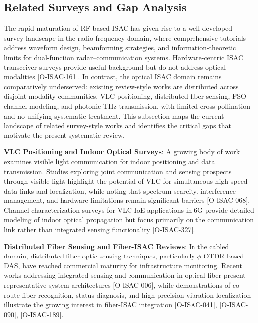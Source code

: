 \subsection{Related Surveys and Gap Analysis}
\label{sec:intro-related}

The rapid maturation of RF-based ISAC has given rise to a well-developed survey landscape in the radio-frequency domain, where comprehensive tutorials address waveform design, beamforming strategies, and information-theoretic limits for dual-function radar--communication systems. Hardware-centric ISAC transceiver surveys provide useful background but do not address optical modalities [O-ISAC-161]. In contrast, the optical ISAC domain remains comparatively underserved: existing review-style works are distributed across disjoint modality communities, VLC positioning, distributed fiber sensing, FSO channel modeling, and photonic-THz transmission, with limited cross-pollination and no unifying systematic treatment. This subsection maps the current landscape of related survey-style works and identifies the critical gaps that motivate the present systematic review.

\textbf{VLC Positioning and Indoor Optical Surveys}: A growing body of work examines visible light communication for indoor positioning and data transmission. Studies exploring joint communication and sensing prospects through visible light highlight the potential of VLC for simultaneous high-speed data links and localization, while noting that spectrum scarcity, interference management, and hardware limitations remain significant barriers [O-ISAC-068]. Channel characterization surveys for VLC-IoE applications in 6G provide detailed modeling of indoor optical propagation but focus primarily on the communication link rather than integrated sensing functionality [O-ISAC-327].

\textbf{Distributed Fiber Sensing and Fiber-ISAC Reviews}: In the cabled domain, distributed fiber optic sensing techniques, particularly $\phi$-OTDR-based DAS, have reached commercial maturity for infrastructure monitoring. Recent works addressing integrated sensing and communication in optical fiber present representative system architectures [O-ISAC-006], while demonstrations of co-route fiber recognition, status diagnosis, and high-precision vibration localization illustrate the growing interest in fiber-ISAC integration [O-ISAC-041], [O-ISAC-090], [O-ISAC-189].

